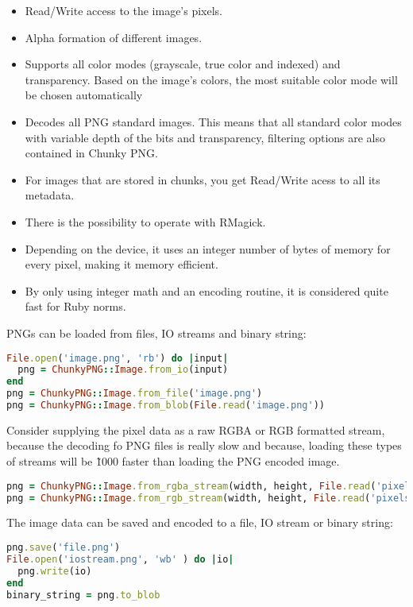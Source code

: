 \begin{itemize}
  \item Read/Write access to the image’s pixels.
  \item Alpha formation of different images.
  \item Supports all color modes (grayscale, true color and indexed) and transparency. Based on the image’s colors, the most suitable color mode will be chosen automatically
  \item Decodes all PNG standard images. This means that all standard color modes with variable depth of the bits and transparency, filtering options are also contained in Chunky PNG.
  \item For images that are stored in chunks, you get Read/Write acess to all its metadata.
  \item There is the possibility to operate with RMagick.
  \item Depending on the device, it uses an integer number of bytes of memory for every pixel, making it memory efficient.
  \item By only using integer math and an encoding routine, it is considered quite fast for Ruby norms. 
\end{itemize}

PNGs can be loaded from files, IO streams and binary string:

\begin{lstlisting}[language=Ruby, caption={Loading PNGs with Chunky PNG}, label=chunky_png1]
File.open('image.png', 'rb') do |input| 
  png = ChunkyPNG::Image.from_io(input)
end
png = ChunkyPNG::Image.from_file('image.png')
png = ChunkyPNG::Image.from_blob(File.read('image.png'))
\end{lstlisting}

Consider supplying the pixel data as a raw RGBA or RGB formatted stream, because the decoding fo PNG files is really slow and because, loading these types of streams will be \~1000 faster than loading the PNG encoded image.

\begin{lstlisting}[language=Ruby, caption={Loading pixel stream with Chunky PNG}, label=chunky_png2]
png = ChunkyPNG::Image.from_rgba_stream(width, height, File.read('pixels.rgba'))
png = ChunkyPNG::Image.from_rgb_stream(width, height, File.read('pixels.rgb'))
\end{lstlisting}

The image data can be saved and encoded to a file, IO stream or binary string:
\begin{lstlisting}[language=Ruby, caption={Loading pixel stream with Chunky PNG}, label=chunky_png3]
png.save('file.png')
File.open('iostream.png', 'wb' ) do |io| 
  png.write(io)
end
binary_string = png.to_blob
\end{lstlisting}


